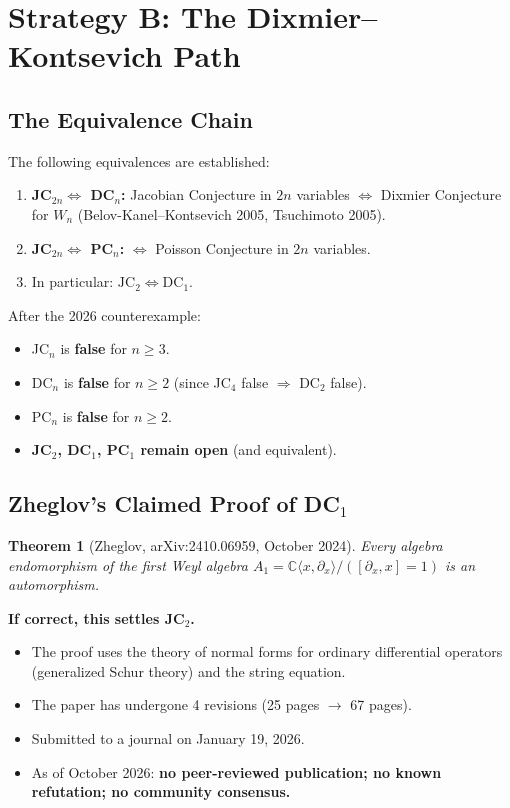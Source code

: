 \documentclass[12pt,a4paper]{article}
\newtheorem{theorem}{Theorem}[section]
\theoremstyle{definition}
\newcommand{\CC}{\mathbb{C}}
\begin{document}
\section{Strategy B: The Dixmier--Kontsevich Path}

\subsection{The Equivalence Chain}
The following equivalences are established:
\begin{enumerate}
\item \textbf{JC$_{2n} \Leftrightarrow$ DC$_n$:} Jacobian Conjecture in $2n$
  variables $\Leftrightarrow$ Dixmier Conjecture for $W_n$ (Belov-Kanel--Kontsevich
  2005, Tsuchimoto 2005).
\item \textbf{JC$_{2n} \Leftrightarrow$ PC$_n$:} $\Leftrightarrow$ Poisson Conjecture
  in $2n$ variables.
\item In particular: $\boxed{\text{JC}_2 \Leftrightarrow \text{DC}_1}$.
\end{enumerate}

After the 2026 counterexample:
\begin{itemize}
\item JC$_n$ is \textbf{false} for $n \geq 3$.
\item DC$_n$ is \textbf{false} for $n \geq 2$ (since JC$_4$ false $\Rightarrow$ DC$_2$ false).
\item PC$_n$ is \textbf{false} for $n \geq 2$.
\item \textbf{JC$_2$, DC$_1$, PC$_1$ remain open} (and equivalent).
\end{itemize}

\subsection{Zheglov's Claimed Proof of DC$_1$}

\begin{theorem}[Zheglov, arXiv:2410.06959, October 2024]
Every algebra endomorphism of the first Weyl algebra $A_1 = \CC\langle x, \partial_x \rangle
/ ([\partial_x, x] = 1)$ is an automorphism.
\end{theorem}

\textbf{If correct, this settles JC$_2$.}

\begin{itemize}
\item The proof uses the theory of normal forms for ordinary differential operators
  (generalized Schur theory) and the string equation.
\item The paper has undergone 4 revisions (25 pages $\to$ 67 pages).
\item Submitted to a journal on January 19, 2026.
\item As of October 2026: \textbf{no peer-reviewed publication; no known refutation;
  no community consensus.}
\end{itemize}
\end{document}
